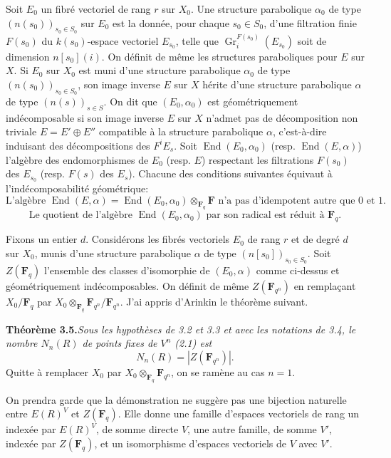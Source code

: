 \documentclass[11pt]{article}
\newcommand{\Fq}{\mathbf{F}_q}
\newcommand{\Fqn}{\mathbf{F}_{q^n}}
\newcommand{\F}{\mathbf{F}}
\newcommand{\End}{\operatorname{End}}
\newcommand{\Gr}{\operatorname{Gr}}
\begin{document}
Soit \(E_0\) un fibré vectoriel de rang \(r\) sur \(X_0\). Une structure parabolique \(\alpha_0\) de type \((n(s_0))_{s_0\in S_0}\) sur \(E_0\) est la donnée, pour chaque \(s_0\in S_0\), d'une filtration finie \(F(s_0)\) du \(k(s_0)\)-espace vectoriel \(E_{s_0}\), telle que \(\Gr_i^{F(s_0)}(E_{s_0})\) soit de dimension \(n[s_0](i)\). On définit de même les structures paraboliques pour \(E\) sur \(X\). Si \(E_0\) sur \(X_0\) est muni d'une structure parabolique \(\alpha_0\) de type \((n(s_0))_{s_0\in S_0}\), son image inverse \(E\) sur \(X\) hérite d'une structure parabolique \(\alpha\) de type \((n(s))_{s\in S}\). On dit que \((E_0,\alpha_0)\) est géométriquement indécomposable si son image inverse \(E\) sur \(X\) n'admet pas de décomposition non triviale \(E=E'\oplus E''\) compatible à la structure parabolique \(\alpha\), c'est-à-dire induisant des décompositions des \(F^iE_s\). Soit \(\End(E_0,\alpha_0)\) (resp. \(\End(E,\alpha)\)) l'algèbre des endomorphismes de \(E_0\) (resp. \(E\)) respectant les filtrations \(F(s_0)\) des \(E_{s_0}\) (resp. \(F(s)\) des \(E_s\)). Chacune des conditions suivantes équivaut à l'indécomposabilité géométrique:
\begin{equation}
\text{L'algèbre }\End(E,\alpha)=\End(E_0,\alpha_0)\otimes_{\Fq}\F\text{ n'a pas d'idempotent autre que }0\text{ et }1.
\tag{3.4.2}
\end{equation}
\begin{equation}
\text{Le quotient de l'algèbre }\End(E_0,\alpha_0)\text{ par son radical est réduit à }\Fq.
\tag{3.4.3}
\end{equation}

Fixons un entier \(d\). Considérons les fibrés vectoriels \(E_0\) de rang \(r\) et de degré \(d\) sur \(X_0\), munis d'une structure parabolique \(\alpha\) de type \((n[s_0])_{s_0\in S_0}\). Soit \(Z(\Fq)\) l'ensemble des classes d'isomorphie de \((E_0,\alpha)\) comme ci-dessus et géométriquement indécomposables. On définit de même \(Z(\Fqn)\) en remplaçant \(X_0/\Fq\) par \(X_0\otimes_{\Fq}\Fqn/\Fqn\). J'ai appris d'Arinkin le théorème suivant.

\noindent\textbf{Théorème 3.5.}\quad\textit{Sous les hypothèses de 3.2 et 3.3 et avec les notations de 3.4, le nombre \(N_n(R)\) de points fixes de \(V^n\) (2.1) est}
\begin{equation}
  N_n(R)=|Z(\Fqn)|.
\tag{3.5.1}
\end{equation}
Quitte à remplacer \(X_0\) par \(X_0\otimes_{\Fq}\Fqn\), on se ramène au cas \(n=1\).

On prendra garde que la démonstration ne suggère pas une bijection naturelle entre \(E(R)^V\) et \(Z(\Fq)\). Elle donne une famille d'espaces vectoriels de rang un indexée par \(E(R)^V\), de somme directe \(V\), une autre famille, de somme \(V'\), indexée par \(Z(\Fq)\), et un isomorphisme d'espaces vectoriels de \(V\) avec \(V'\).
\end{document}
